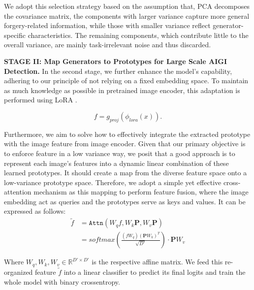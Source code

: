     We adopt this selection strategy based on the assumption that, PCA decomposes the covariance matrix, the components with larger variance capture more general forgery-related information, while those with smaller variance reflect generator-specific characteristics. The remaining components, which contribute little to the overall variance, are mainly task-irrelevant noise and thus discarded. 
    
\textbf{STAGE II: Map Generators to Prototypes for Large Scale AIGI Detection.}
   In the second stage, we further enhance the model's capability, adhering to our principle of not relying on a fixed embedding space. To maintain as much knowledge as possible in pretrained image encoder, this adaptation is performed using LoRA \cite{hu2022lora}.
   
    \begin{equation}
        f=g_{proj}\left( \phi_{lora}(x) \right).
    \end{equation}
        
  Furthermore, we aim to solve how to effectively integrate the extracted prototype with the image feature from image encoder. Given that our primary objective is to enforce feature in a low variance way, we posit that a good approach is to represent each image's features into a dynamic linear combination of these learned prototypes. It should create a map from the diverse feature space onto a low-variance prototype space. Therefore, we adopt a simple yet effective cross-attention \cite{vaswani2017attention} mechanism as this mapping to perform feature fusion, where the image embedding act as queries and the prototypes serve as keys and values. It can be expressed as follows: 
\begin{equation}
 \begin{split}
    \tilde{f} & = \texttt{Attn} \left(W_qf, W_k\mathbf{P}, W_v\textbf{P} \right) \\
      & =  softmax(\frac{(fW_q)(\mathbf{P}W_k)^T}{\sqrt{D'}}) \cdot \mathbf{P}W_v 
 \end{split}
 \end{equation}

    Where $W_q,W_k,W_v \in \mathbb{R}^{D' \times D'}$ is the respective affine matrix. We feed this re-organized feature $ \tilde{f} $ into a linear classifier to predict its final logits and train the whole model with binary crossentropy.

